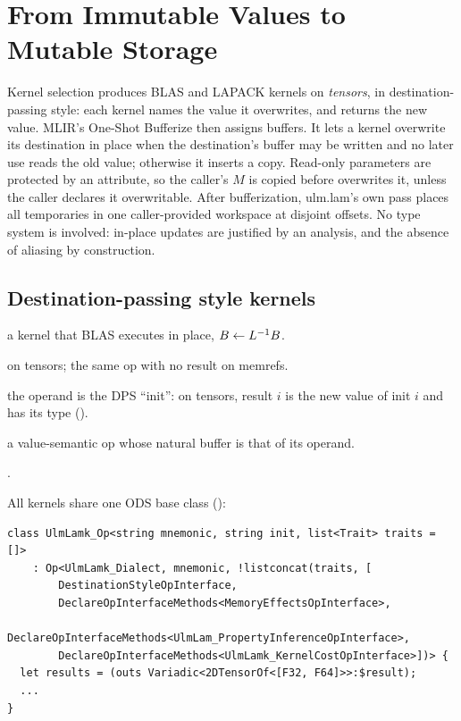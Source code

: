 \chapter{From Immutable Values to Mutable Storage}
\label{ch:storage}

\begin{answer}
Kernel selection produces BLAS and LAPACK kernels on \emph{tensors}, in
destination-passing style: each kernel names the value it overwrites, and
returns the new value. MLIR's One-Shot Bufferize then assigns buffers. It
lets a kernel overwrite its destination in place when the destination's
buffer may be written and no later use reads the old value; otherwise it
inserts a copy. Read-only parameters are protected by an attribute, so the
caller's \(M\) is copied before  overwrites it, unless the
caller declares it overwritable. After bufferization, ulm.lam's own pass
places all temporaries in one caller-provided workspace at disjoint
offsets. No type system is involved: in-place updates are justified by an
analysis, and the absence of aliasing by construction.
\end{answer}

\section{Destination-passing style kernels}
\label{sec:storage-dps}

\begin{steps}
\item[Input] a kernel that BLAS executes in place, \(B \leftarrow L^{-1} B\).
\item[Representation]  on tensors; the same op with no result on memrefs.
\item[Rule] the  operand is the DPS ``init'': on tensors, result \(i\) is the new value of init \(i\) and has its type ().
\item[Output] a value-semantic op whose natural buffer is that of its  operand.
\item[Theory] .
\end{steps}

All kernels share one ODS base class
():

\begin{lstlisting}[style=td]
class UlmLamk_Op<string mnemonic, string init, list<Trait> traits = []>
    : Op<UlmLamk_Dialect, mnemonic, !listconcat(traits, [
        DestinationStyleOpInterface,
        DeclareOpInterfaceMethods<MemoryEffectsOpInterface>,
        DeclareOpInterfaceMethods<UlmLam_PropertyInferenceOpInterface>,
        DeclareOpInterfaceMethods<UlmLamk_KernelCostOpInterface>])> {
  let results = (outs Variadic<2DTensorOf<[F32, F64]>>:$result);
  ...
}
\end{lstlisting}

